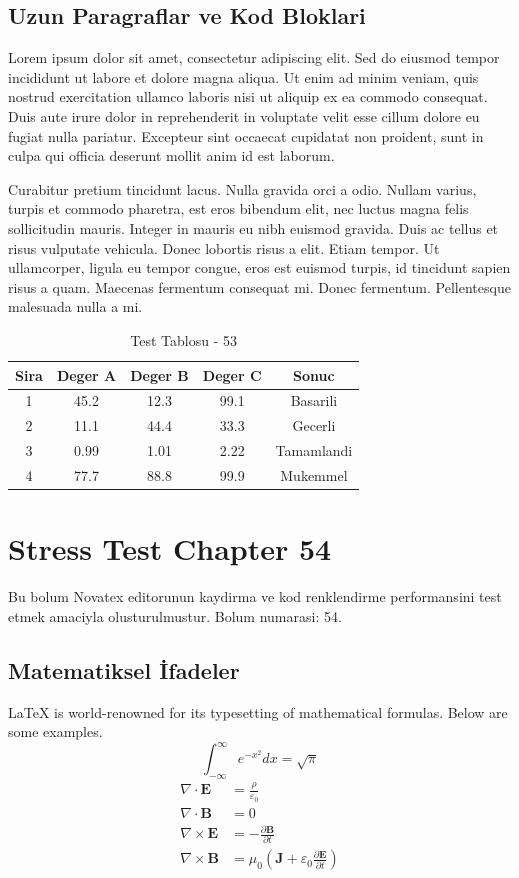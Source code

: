 \documentclass[12pt,a4paper]{article}
\begin{document}
\subsection{Uzun Paragraflar ve Kod Bloklari}
Lorem ipsum dolor sit amet, consectetur adipiscing elit. Sed do eiusmod tempor incididunt ut labore et dolore magna aliqua. Ut enim ad minim veniam, quis nostrud exercitation ullamco laboris nisi ut aliquip ex ea commodo consequat. Duis aute irure dolor in reprehenderit in voluptate velit esse cillum dolore eu fugiat nulla pariatur. Excepteur sint occaecat cupidatat non proident, sunt in culpa qui officia deserunt mollit anim id est laborum.

Curabitur pretium tincidunt lacus. Nulla gravida orci a odio. Nullam varius, turpis et commodo pharetra, est eros bibendum elit, nec luctus magna felis sollicitudin mauris. Integer in mauris eu nibh euismod gravida. Duis ac tellus et risus vulputate vehicula. Donec lobortis risus a elit. Etiam tempor. Ut ullamcorper, ligula eu tempor congue, eros est euismod turpis, id tincidunt sapien risus a quam. Maecenas fermentum consequat mi. Donec fermentum. Pellentesque malesuada nulla a mi.

\begin{table}[h!]
\centering
\begin{tabular}{|c|c|c|c|c|}
\hline
\textbf{Sira} & \textbf{Deger A} & \textbf{Deger B} & \textbf{Deger C} & \textbf{Sonuc} \\
\hline
1 & 45.2 & 12.3 & 99.1 & Basarili \\
2 & 11.1 & 44.4 & 33.3 & Gecerli \\
3 & 0.99 & 1.01 & 2.22 & Tamamlandi \\
4 & 77.7 & 88.8 & 99.9 & Mukemmel \\
\hline
\end{tabular}
\caption{Test Tablosu - 53}
\end{table}

\newpage
\section{Stress Test Chapter 54}
Bu bolum Novatex editorunun kaydirma ve kod renklendirme performansini test etmek amaciyla olusturulmustur. Bolum numarasi: 54.

\subsection{Matematiksel İfadeler}
\LaTeX{} is world-renowned for its typesetting of mathematical formulas. Below are some examples.
\begin{equation}
\int_{-\infty}^{\infty} e^{-x^2} dx = \sqrt{\pi}
\end{equation}
\begin{align}
\nabla \cdot \mathbf{E} &= \frac{\rho}{\varepsilon_0} \\
\nabla \cdot \mathbf{B} &= 0 \\
\nabla \times \mathbf{E} &= -\frac{\partial \mathbf{B}}{\partial t} \\
\nabla \times \mathbf{B} &= \mu_0\left(\mathbf{J} + \varepsilon_0 \frac{\partial \mathbf{E}}{\partial t}\right)
\end{align}
\end{document}
